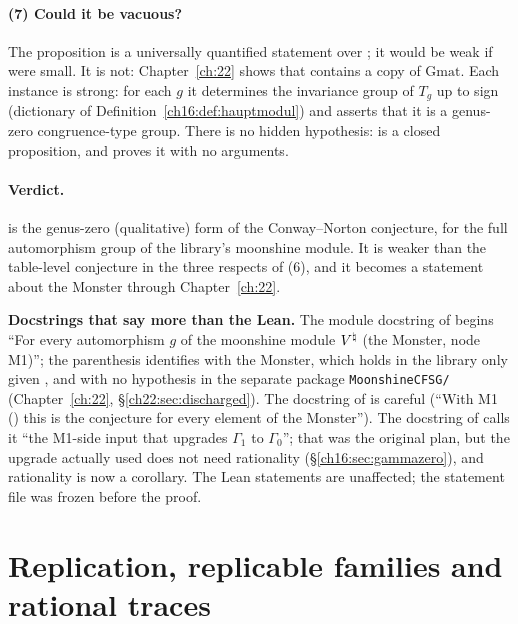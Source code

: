 \paragraph{(7) Could it be vacuous?}  The proposition is a universally quantified statement over ; it
would be weak if  were small.  It is not: Chapter~\ref{ch:22} shows that  contains a copy
of $\mathrm{Gmat}$.  Each instance is strong: for each $g$ it determines the invariance group of $T_g$ up to sign
(dictionary of Definition~\ref{ch16:def:hauptmodul}) and asserts that it is a genus-zero congruence-type group.  There
is no hidden hypothesis:  is a closed proposition, and  proves it with
no arguments.

\paragraph{Verdict.}   is the genus-zero (qualitative) form of the Conway--Norton
conjecture, for the full automorphism group of the library's moonshine module.  It is weaker than the table-level
conjecture in the three respects of (6), and it becomes a statement about the Monster through Chapter~\ref{ch:22}.

\begin{warning}
\textbf{Docstrings that say more than the Lean.}  The module docstring of
 begins ``For every automorphism $g$ of the moonshine module
${V^{\natural}}$ (the Monster, node M1)''; the parenthesis identifies  with the Monster, which holds in the library
only given , and with no hypothesis in the separate package \texttt{MoonshineCFSG/} (Chapter~\ref{ch:22},
\S\ref{ch22:sec:discharged}).  The docstring of  is careful (``With M1
() this is the conjecture for every element of the Monster'').  The docstring of
 calls it ``the M1-side input that upgrades $\Gamma_1$ to $\Gamma_0$''; that was the original plan, but the upgrade actually used does not need rationality (\S\ref{ch16:sec:gammazero}), and rationality
is now a corollary.  The Lean statements are unaffected; the statement file was frozen before the proof.
\end{warning}


\section{Replication, replicable families and rational traces}\label{ch16:sec:replication}

